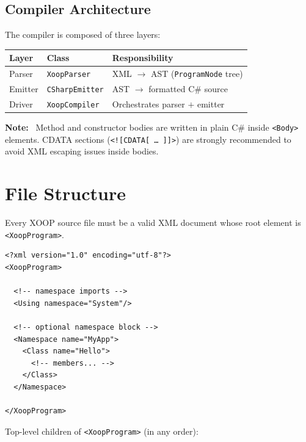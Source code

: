 \documentclass[11pt,a4paper]{article}
\newcommand{\el}[1]{\texttt{\textcolor{xoop-keyword}{<#1>}}}
\newcommand{\cs}[1]{\texttt{#1}}
\newenvironment{note}{%
  \begin{mdframed}[backgroundcolor=xoop-bg,linecolor=xoop-border,
                   innertopmargin=6pt,innerbottommargin=6pt,
                   innerleftmargin=10pt,innerrightmargin=6pt]
  \small\textbf{Note:}\ }{%
  \end{mdframed}}
\begin{document}
\subsection{Compiler Architecture}

The compiler is composed of three layers:

\begin{center}
\begin{tabular}{lll}
\toprule
\textbf{Layer} & \textbf{Class} & \textbf{Responsibility} \\
\midrule
Parser  & \cs{XoopParser}    & XML $\rightarrow$ AST (\cs{ProgramNode} tree) \\
Emitter & \cs{CSharpEmitter} & AST $\rightarrow$ formatted C\# source \\
Driver  & \cs{XoopCompiler}  & Orchestrates parser $+$ emitter \\
\bottomrule
\end{tabular}
\end{center}

\begin{note}
Method and constructor bodies are written in plain C\# inside
\texttt{<Body>} elements. CDATA sections (\texttt{<![CDATA[\ \ldots\ ]]>}) are
strongly recommended to avoid XML escaping issues inside bodies.
\end{note}

\section{File Structure}

Every XOOP source file must be a valid XML document whose root element is
\el{XoopProgram}.

\begin{lstlisting}[caption={Minimal XOOP file skeleton}]
<?xml version="1.0" encoding="utf-8"?>
<XoopProgram>

  <!-- namespace imports -->
  <Using namespace="System"/>

  <!-- optional namespace block -->
  <Namespace name="MyApp">
    <Class name="Hello">
      <!-- members... -->
    </Class>
  </Namespace>

</XoopProgram>
\end{lstlisting}

Top-level children of \el{XoopProgram} (in any order):
\end{document}
